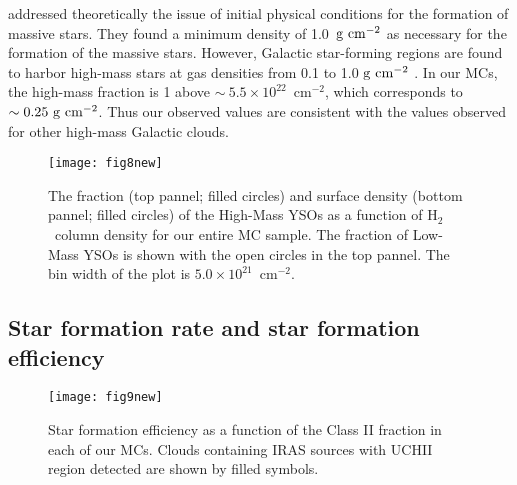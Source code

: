 \documentclass[iop]{emulateapj}
\newcommand{\cmsq}{cm$^{-2}$}
\begin{document}
\citet{krumholz+08} addressed theoretically the issue of initial physical conditions 
for the formation of massive stars. They found a 
minimum density of 1.0~${\rm g}~{\rm cm}^{-2}$ as necessary for the formation 
of the massive stars. However, Galactic star-forming regions are found to
harbor high-mass stars at gas densities from 0.1 to 1.0 ${\rm g}~{\rm cm}^{-2}$
\citep{rathborne+09,ragan+13}. In our MCs, the high-mass fraction is 1 above 
$\sim~5.5\times10^{22}$~\cmsq, which corresponds to $\sim0.25~{\rm g}~{\rm cm}^{-2}$. 
Thus our observed values are consistent with the values observed for other high-mass Galactic clouds.

\begin{figure}[ht!]
     \begin{center}
     \texttt{[image: fig8new]}
    \end{center}
\caption{
The fraction (top pannel; filled circles) and surface density (bottom pannel; filled circles) 
of the High-Mass YSOs as a function of H$_2$~column density for our entire MC sample.
The fraction of Low-Mass YSOs is shown with the open circles in the top pannel. 
The bin width of the plot is $5.0\times10^{21}$~\cmsq.
}
\label{figure8}
\end{figure}



\subsection{Star formation rate and star formation efficiency}

\begin{figure}[h!]
     \begin{center}
            \texttt{[image: fig9new]} \\
    \end{center}
    \caption{
Star formation efficiency as a function of the Class II fraction in 
each of our MCs. Clouds containing IRAS sources with UCHII region detected 
are shown by filled symbols.
     }
   \label{figure9}
\end{figure}
\end{document}
